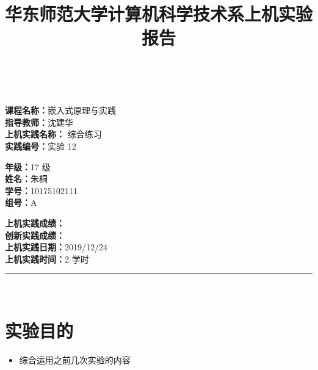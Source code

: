 \documentclass[a4paper,10pt,UTF8]{paper}
\title{华东师范大学计算机科学技术系上机实验报告}
\numberwithin{equation}{section}
\numberwithin{figure}{section}
\begin{document}
\pagestyle{fancy}
\lhead{}
\rhead{}
\makeatletter
\def\headrule{{\if@fancyplain\let\headrulewidth\plainheadrulewidth\fi%
    \color{gray}\hrule\@height 0.2pt\@width\headwidth}
    \vspace{6mm}}
\makeatother

\newcommand{\HRule}{\rule{\linewidth}{1mm}}
\newcommand{\dai}{\textbf{Dais-CMX16$^+$}}

{ \\ [0.8cm]
                            
    \small{
        \begin{minipage}[t]{.32\linewidth}
            \textbf{课程名称：}嵌入式原理与实践\\
            \textbf{指导教师：}沈建华\\
            \textbf{上机实践名称：} 综合练习\\
            \textbf{实践编号：}实验 12
        \end{minipage}
        \begin{minipage}[t]{.32\linewidth}
            \textbf{年级：}17 级\\
            \textbf{姓名：}朱桐\\
            \textbf{学号：}10175102111\\
            \textbf{组号：}A
        \end{minipage} 
        \begin{minipage}[t]{.32\linewidth}
            \textbf{上机实践成绩：} \\
            \textbf{创新实践成绩：} \\
            \textbf{上机实践日期：}2019/12/24\\
            \textbf{上机实践时间：}2 学时\\
        \end{minipage}
    }
    \HRule \\[0.5cm]
}



\section{实验目的}

\begin{itemize}
    \item 综合运用之前几次实验的内容
\end{itemize}
\end{document}
